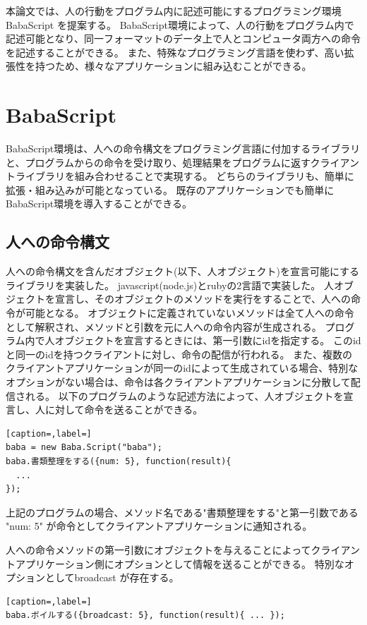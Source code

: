 \documentclass{deimj}
\begin{document}
本論文では、人の行動をプログラム内に記述可能にするプログラミング環境 BabaScript を提案する。
BabaScript環境によって、人の行動をプログラム内で記述可能となり、同一フォーマットのデータ上で人とコンピュータ両方への命令を記述することができる。
また、特殊なプログラミング言語を使わず、高い拡張性を持つため、様々なアプリケーションに組み込むことができる。

\section{BabaScript}

BabaScript環境は、人への命令構文をプログラミング言語に付加するライブラリと、プログラムからの命令を受け取り、処理結果をプログラムに返すクライアントライブラリを組み合わせることで実現する。
どちらのライブラリも、簡単に拡張・組み込みが可能となっている。
既存のアプリケーションでも簡単にBabaScript環境を導入することができる。

\subsection{人への命令構文}
人への命令構文を含んだオブジェクト(以下、人オブジェクト)を宣言可能にするライブラリを実装した。
javascript(node.js)とrubyの2言語で実装した。
人オブジェクトを宣言し、そのオブジェクトのメソッドを実行をすることで、人への命令が可能となる。
オブジェクトに定義されていないメソッドは全て人への命令として解釈され、メソッドと引数を元に人への命令内容が生成される。
プログラム内で人オブジェクトを宣言するときには、第一引数にidを指定する。
このidと同一のidを持つクライアントに対し、命令の配信が行われる。
また、複数のクライアントアプリケーションが同一のidによって生成されている場合、特別なオプションがない場合は、命令は各クライアントアプリケーションに分散して配信される。
以下のプログラムのような記述方法によって、人オブジェクトを宣言し、人に対して命令を送ることができる。

\begin{lstlisting}[caption=,label=]
baba = new Baba.Script("baba");
baba.書類整理をする({num: 5}, function(result){
  ...
});
\end{lstlisting}
上記のプログラムの場合、メソッド名である"書類整理をする"と第一引数である "{num: 5}" が命令としてクライアントアプリケーションに通知される。

人への命令メソッドの第一引数にオブジェクトを与えることによってクライアントアプリケーション側にオプションとして情報を送ることができる。
特別なオプションとしてbroadcast が存在する。

\begin{lstlisting}[caption=,label=]
baba.ボイルする({broadcast: 5}, function(result){ ... });
\end{lstlisting}
\end{document}
